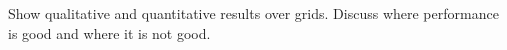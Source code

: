 Show qualitative and quantitative results over grids. Discuss where performance is good and where it is not good.









































\subsubsection{}